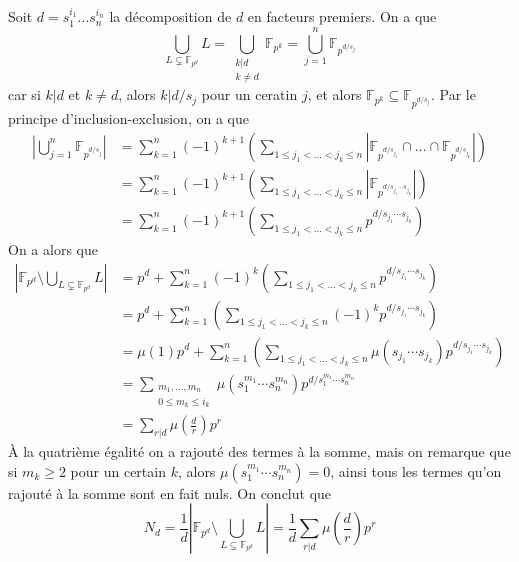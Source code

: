 \documentclass{article}
\newcommand{\F}{\mathbb{F}}
\begin{document}
Soit $d = s_1^{i_1} \dots s_n^{i_n}$ la décomposition de $d$
en facteurs premiers.
On a que
\begin{equation*}
	\bigcup_{L \subsetneq \F_{p^d}}L
	= \bigcup_{\substack{k|d \\ k \neq d}}\F_{p^k}
	= \bigcup_{j = 1}^n\F_{p^{d/s_j}}	
\end{equation*}
car si $k|d$ et $k \neq d$, alors $k|d/s_j$ pour un ceratin $j$, et
alors $\F_{p^k} \subseteq \F_{p^{d/s_j}}$.
Par le principe d'inclusion-exclusion, on a que
\begin{align*}
	|\bigcup_{j = 1}^n\F_{p^{d/s_j}}|
	&= \sum_{k = 1}^n (-1)^{k+1}\left(
		\sum_{1 \leq j_1 < \dots < j_k \leq n}
		|\F_{p^{d/s_{j_1}}} \cap \dots \cap \F_{p^{d/s_{j_k}}}|
	\right) \\
	&= \sum_{k = 1}^n (-1)^{k+1}\left(
		\sum_{1 \leq j_1 < \dots < j_k \leq n}
		|\F_{p^{d/s_{j_1}\cdots s_{j_k}}}|
	\right) \\ 
	&= \sum_{k = 1}^n (-1)^{k+1}\left(
		\sum_{1 \leq j_1 < \dots < j_k \leq n}
		p^{d/s_{j_1}\cdots s_{j_k}}
	\right)
\end{align*}
On a alors que
\begin{align*}
	|\F_{p^d} \setminus \bigcup_{L \subsetneq \F_{p^d}}L|
	&= p^d + \sum_{k = 1}^n (-1)^{k}\left(
		\sum_{1 \leq j_1 < \dots < j_k \leq n}
		p^{d/s_{j_1}\cdots s_{j_k}}
	\right)\\
	&= p^d + \sum_{k = 1}^n \left(
		\sum_{1 \leq j_1 < \dots < j_k \leq n}
		(-1)^k p^{d/s_{j_1}\cdots s_{j_k}}
	\right)\\
	&= \mu(1)p^d + \sum_{k = 1}^n \left(
		\sum_{1 \leq j_1 < \dots < j_k \leq n}
		\mu(s_{j_1}\cdots s_{j_k}) p^{d/s_{j_1}\cdots s_{j_k}}
	\right)\\
	&= 
	\sum_{\substack{m_1, \dots, m_n \\ 0 \leq m_k \leq i_k}}
	\mu(s_1^{m_1}\cdots s_n^{m_n}) p^{d/s_1^{m_1}\cdots s_n^{m_n}}\\
	&= \sum_{r|d} \mu\left( \frac{d}{r}\right)p^r
\end{align*}
À la quatrième égalité on a rajouté des termes à la somme, mais on
remarque que si $m_k \geq 2$ pour un certain $k$, alors 
$\mu(s_1^{m_1} \cdots s_n^{m_n}) = 0$, ainsi tous les termes
qu'on rajouté à la somme sont en fait nuls.
On conclut que
\begin{equation*}
	N_d = \frac{1}{d}
	|\F_{p^d} \setminus \bigcup_{L \subsetneq \F_{p^d}}L|
	= \frac{1}{d}\sum_{r|d} \mu\left( \frac{d}{r}\right)p^r
\end{equation*}
\end{document}

